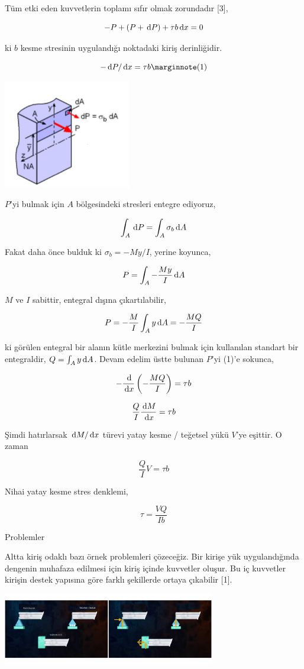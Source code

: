 \documentclass[12pt,fleqn]{article}\usepackage{../../common}
\begin{document}
Tüm etki eden kuvvetlerin toplamı sıfır olmak zorundadır [3],

$$
-P + (P + \,\mathrm{d} P) + \tau b \,\mathrm{d} x = 0
$$

ki $b$ kesme stresinin uygulandığı noktadaki kiriş derinliğidir. 

$$
-\ud P/\ud x = \tau b
\mlabel{1}
$$

\includegraphics[width=15em]{phy_020_strs_00_01.jpg}

$P$'yi bulmak için $A$ bölgesindeki stresleri entegre ediyoruz,

$$
\int_A \,\mathrm{d} P = \int_A \sigma_b \,\mathrm{d} A
$$

Fakat daha önce bulduk ki $\sigma_b = -My / I$, yerine koyunca,

$$
P = \int_A - \frac{My}{I} \,\mathrm{d} A
$$

$M$ ve $I$ sabittir, entegral dışına çıkartılabilir,

$$
P = - \frac{M}{I} \int_A y \,\mathrm{d} A = - \frac{MQ}{I}
$$

ki görülen entegral bir alanın kütle merkezini bulmak için kullanılan standart
bir entegraldir, $Q = \int_A y \,\mathrm{d} A$. Devam edelim üstte bulunan $P$'yi (1)'e
sokunca,

$$
- \frac{\,\mathrm{d}}{\,\mathrm{d} x} \left( - \frac{MQ}{I} \right) = \tau b
$$

$$
\frac{Q}{I} \frac{\,\mathrm{d} M}{\,\mathrm{d} x} = \tau b
$$

Şimdi hatırlarsak $\,\mathrm{d} M/\,\mathrm{d} x$ türevi yatay kesme / teğetsel yükü $V$'ye
eşittir. O zaman

$$
\frac{Q}{I} V = \tau b
$$

Nihai yatay kesme stres denklemi,

$$
\tau = \frac{V Q}{I b}
$$

Problemler

Altta kiriş odaklı bazı örnek problemleri çözeceğiz. Bir kirişe yük
uygulandığında dengenin muhafaza edilmesi için kiriş içinde kuvvetler oluşur.
Bu iç kuvvetler kirişin destek yapısına göre farklı şekillerde ortaya çıkabilir
[1].

\includegraphics[width=25em]{phy_020_strs_01b_01.jpg}
\end{document}
